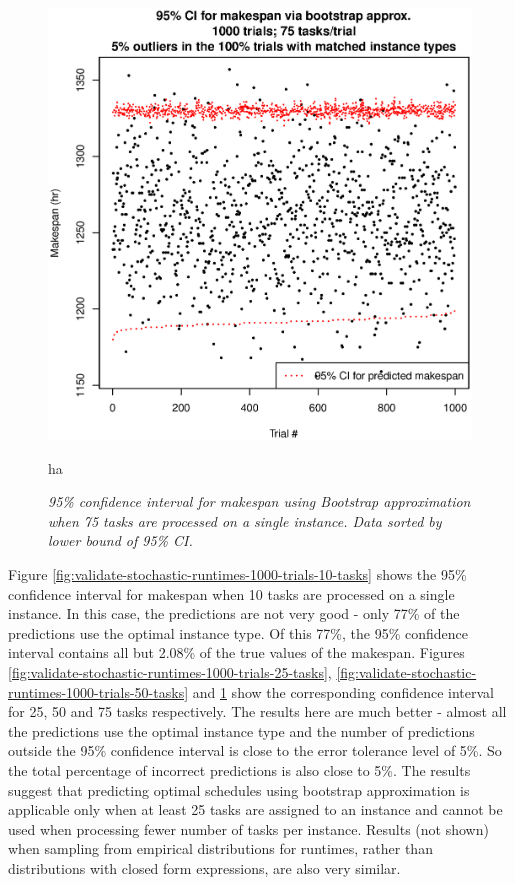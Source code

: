 \documentclass[12pt]{report}
\begin{document}
\begin{figure}
\includegraphics[width=1\textwidth]{validate-stochastic-runtimes-1000-trials-75-tasks.eps}
\caption{\textit{95\% confidence interval for makespan using Bootstrap approximation when 75 tasks are processed on a single instance. Data sorted by lower bound of 95\% CI.}}ha
\label{fig:validate-stochastic-runtimes-1000-trials-75-tasks}
\end{figure}

Figure \ref{fig:validate-stochastic-runtimes-1000-trials-10-tasks} shows the 95\% confidence interval for makespan when 10 tasks are processed on a single instance. 
In this case, the predictions are not very good - only 77\% of the predictions use the optimal instance type.
Of this 77\%, the 95\% confidence interval contains all but 2.08\% of the true values of the makespan.
Figures \ref{fig:validate-stochastic-runtimes-1000-trials-25-tasks}, \ref{fig:validate-stochastic-runtimes-1000-trials-50-tasks} and \ref{fig:validate-stochastic-runtimes-1000-trials-75-tasks} show the corresponding confidence interval for 25, 50 and 75 tasks respectively. 
The results here are much better - almost all the predictions use the optimal instance type and the number of predictions outside the 95\% confidence interval is close to the error tolerance level of 5\%.
So the total percentage of incorrect predictions is also close to 5\%.
The results suggest that predicting optimal schedules using bootstrap approximation is applicable only when at least 25 tasks are assigned to an instance and cannot be used when processing fewer number of tasks per instance.
Results (not shown) when sampling from empirical distributions for runtimes, rather than distributions with closed form expressions, are also very similar.
\end{document}
